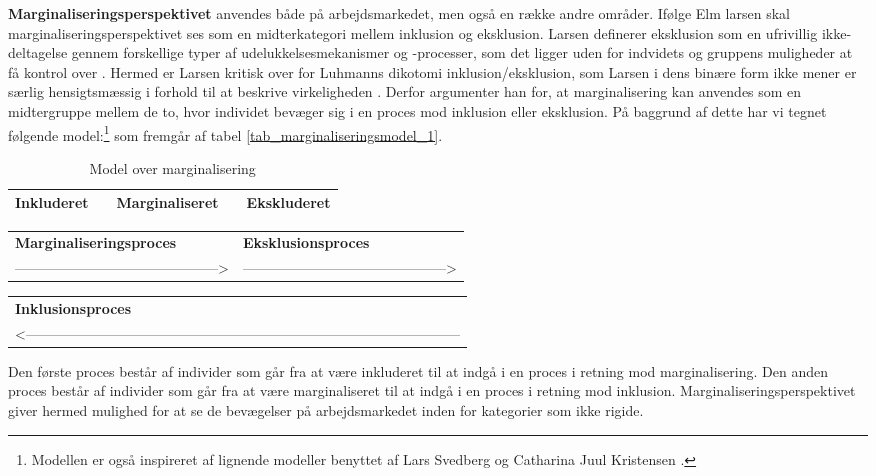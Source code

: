 \textbf{Marginaliseringsperspektivet} anvendes både på arbejdsmarkedet, men også en række andre områder. Ifølge Elm larsen skal marginaliseringsperspektivet ses som en midterkategori mellem inklusion og eksklusion. Larsen definerer eksklusion som en ufrivillig ikke-deltagelse gennem forskellige typer af udelukkelsesmekanismer og -processer, som det ligger uden for indvidets og gruppens muligheder at få kontrol over \parencite[137]{Larsen2009}. Hermed er Larsen kritisk over for Luhmanns dikotomi inklusion/eksklusion, som Larsen i dens binære form ikke mener er særlig hensigtsmæssig i forhold til at beskrive virkeligheden \parencite[130]{Larsen2009}. Derfor argumenter han for, at marginalisering kan anvendes som en midtergruppe mellem de to, hvor individet bevæger sig i en proces mod inklusion eller eksklusion. På baggrund af dette har vi tegnet følgende model:\footnote{Modellen er også inspireret af lignende modeller benyttet af Lars Svedberg \parencite[44]{Svedberg1995} og Catharina Juul Kristensen \parencite[18]{Kristensen1999}.} som fremgår af tabel \ref{tab_marginaliseringsmodel_1}. 
% 
\begin{table}[H] \centering
\caption{Model over marginalisering}
\label{tab_marginaliseringsmodel_3}
\begin{tabular}{@{} m{} c m{} c m{} @{}} \toprule
\textbf{Inkluderet} & & \textbf{Marginaliseret} & & \textbf{Ekskluderet} \\ \midrule
\end{tabular} \end{table} %
\begin{table}[H] \centering
\label{tab_marginaliseringsmodel}
\begin{tabular}{@{} m{} m{} @{}} 
  \textbf{Marginaliseringsproces} & \textbf{Eksklusionsproces} \\  
  --------------------------------------------> & --------------------------------------------> \\ 
\end{tabular} \end{table} %
\begin{table}[H] \centering
\label{tab_marginaliseringsmodel}
\begin{tabular}{@{} m{} @{}} 
  \textbf{Inklusionsproces} \\  
  <--------------------------------------------------------------------------------------------- \\ \bottomrule
\end{tabular} \end{table}
%
Den første proces består af individer som går fra at være inkluderet til at indgå i en proces i retning mod marginalisering. Den anden proces består af individer som går fra at være marginaliseret til at indgå i en proces i retning mod inklusion. Marginaliseringsperspektivet giver hermed mulighed for at se de  bevægelser på arbejdsmarkedet inden for kategorier som ikke rigide.


